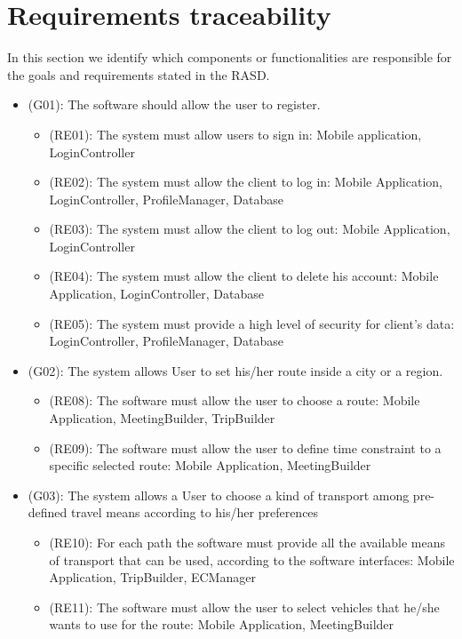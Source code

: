 \documentclass[a4paper,leqno]{article}
\begin{document}
\newpage
\section{Requirements traceability}
In this section we identify which components or functionalities are responsible for the goals and requirements stated in the RASD.

\begin{itemize}
	
	\item (G01): The software should allow the user to register.
	\begin{itemize}
		\item (RE01): The system must allow users to sign in: Mobile application, LoginController
		\item (RE02): The system must allow the client to log in: Mobile Application, LoginController, ProfileManager, Database
		\item (RE03): The system must allow the client to log out: Mobile Application, LoginController
		\item (RE04): The system must allow the client to delete his account: Mobile Application, LoginController, Database
		\item (RE05): The system must provide a high level of security for client's data: LoginController, ProfileManager, Database
	\end{itemize}
	\item (G02): The system allows User to set his/her route inside a city or a region.
	\begin{itemize}
		\item (RE08): The software must allow the user to choose a route: Mobile Application, MeetingBuilder, TripBuilder
		\item (RE09): The software must allow the user to define time constraint to a specific selected route: Mobile Application, MeetingBuilder
	\end{itemize}
	\item (G03): The system allows a User to choose a kind of transport among pre-defined travel means according to his/her preferences
	\begin{itemize}
		\item (RE10): For each path the software must provide all the available means of transport that can be used, according to the software interfaces: Mobile Application, TripBuilder, ECManager
		\item (RE11): The software must allow the user to select vehicles that he/she wants to use for the route: Mobile Application, MeetingBuilder

\end{itemize}
\end{itemize}
\end{document}
